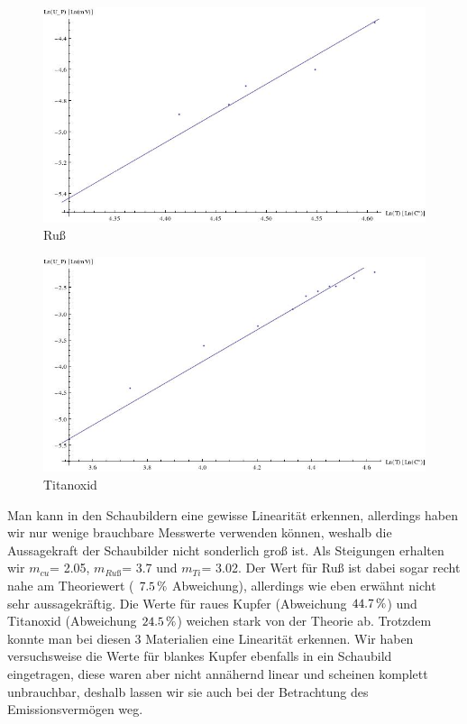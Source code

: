 \documentclass[12pt,twoside,a4paper]{article}
\begin{document}
	\begin{figure}[H]
		\centering
		\includegraphics[scale=.6]{bilder/waerme_1_ru.jpeg} 
		\caption{Ruß}
	\end{figure}
\begin{figure}[H]
		\centering
		\includegraphics[scale=.6]{bilder/waerme_2_ti.jpeg} 
		\caption{Titanoxid}
	\end{figure}
	Man kann in den Schaubildern eine gewisse Linearität erkennen, allerdings haben wir nur wenige brauchbare Messwerte verwenden können, weshalb die Aussagekraft der Schaubilder nicht sonderlich groß ist. Als Steigungen erhalten wir $m_{cu}$= 2.05, $m_{Ruß}$= 3.7 und  $m_{Ti}$= 3.02. Der Wert für Ruß ist dabei sogar recht nahe am Theoriewert ( $\unit[7.5]{\%}$ Abweichung), allerdings wie eben erwähnt nicht sehr aussagekräftig. Die Werte für raues Kupfer (Abweichung $\unit[44.7]{\%}$) und Titanoxid (Abweichung $\unit[24.5]{\%}$) weichen stark von der Theorie ab. Trotzdem konnte man bei diesen 3 Materialien eine Linearität erkennen. Wir haben versuchsweise die Werte für blankes Kupfer ebenfalls in ein Schaubild eingetragen, diese waren aber nicht annähernd linear und scheinen komplett unbrauchbar, deshalb lassen wir sie auch bei der Betrachtung des Emissionsvermögen weg.
\end{document}
